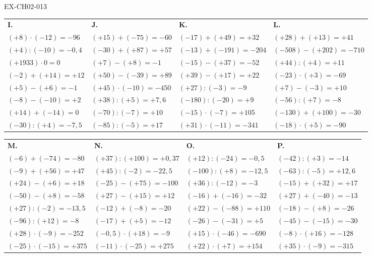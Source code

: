 \begin{solution}{EX-CH02-013}
\bigskip
\begin{tabularx}{\linewidth}{*{4}{X}}
\textbf{I.} & \textbf{J.} & \textbf{K.} & \textbf{L.} \\
$(+8)\cdot(-12)=-96$  & $(+15)+(-75)=-60$    & $(-17)+(+49)=+32$    & $(+28)+(+13)=+41$     \\
$(+4):(-10)=-0{,}4$   & $(-30)+(+87)=+57$    & $(-13)+(-191)=-204$  & $(-508)-(+202)=-710$  \\
$(+1933)\cdot 0=0$    & $(+7)-(+8)=-1$       & $(-15)-(+37)=-52$    & $(+44):(+4)=+11$      \\
$(-2)+(+14)=+12$      & $(+50)-(-39)=+89$    & $(+39)-(+17)=+22$    & $(-23)\cdot(+3)=-69$  \\
$(+5)-(+6)=-1$        & $(+45)\cdot(-10)=-450$& $(+27):(-3)=-9$     & $(+7)-(-3)=+10$       \\
$(-8)-(-10)=+2$       & $(+38):(+5)=+7{,}6$  & $(-180):(-20)=+9$    & $(-56):(+7)=-8$       \\
$(+14)+(-14)=0$       & $(-70):(-7)=+10$     & $(-15)\cdot(-7)=+105$& $(-130)+(+100)=-30$   \\
$(-30):(+4)=-7{,}5$   & $(-85):(-5)=+17$     & $(+31)\cdot(-11)=-341$& $(-18)\cdot(+5)=-90$ \\
\end{tabularx}

\bigskip
\begin{tabularx}{\linewidth}{*{4}{X}}
\textbf{M.} & \textbf{N.} & \textbf{O.} & \textbf{P.} \\
$(-6)+(-74)=-80$      & $(+37):(+100)=+0{,}37$ & $(+12):(-24)=-0{,}5$  & $(-42):(+3)=-14$      \\
$(-9)+(+56)=+47$      & $(+45):(-2)=-22{,}5$   & $(-100):(+8)=-12{,}5$ & $(-63):(-5)=+12{,}6$  \\
$(+24)-(+6)=+18$      & $(-25)-(+75)=-100$     & $(+36):(-12)=-3$      & $(-15)+(+32)=+17$     \\
$(-50)-(+8)=-58$      & $(+27)-(+15)=+12$      & $(-16)+(-16)=-32$     & $(+27)+(-40)=-13$     \\
$(+27):(-2)=-13{,}5$  & $(-12)+(-8)=-20$       & $(+22)-(-88)=+110$    & $(-18)-(+8)=-26$      \\
$(-96):(+12)=-8$      & $(-17)+(+5)=-12$       & $(-26)-(-31)=+5$      & $(-45)-(-15)=-30$     \\
$(+28)\cdot(-9)=-252$ & $(-0{,}5)\cdot(+18)=-9$& $(+15)\cdot(-46)=-690$& $(-8)\cdot(+16)=-128$ \\
$(-25)\cdot(-15)=+375$& $(-11)\cdot(-25)=+275$ & $(+22)\cdot(+7)=+154$ & $(+35)\cdot(-9)=-315$ \\
\end{tabularx}

\end{solution}